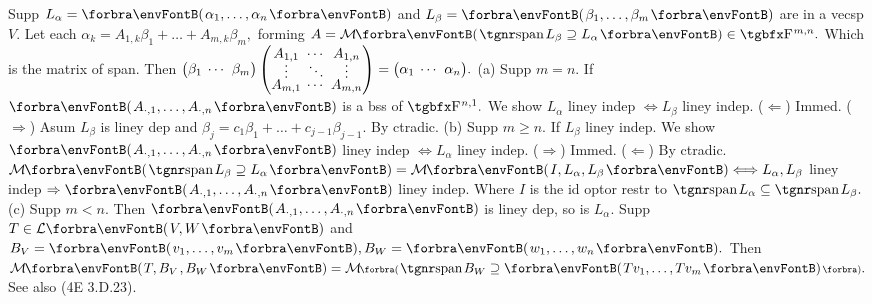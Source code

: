 
\vspace{8pt}

\BulletPointX\NoteFor{[3.30, 32]}\;\TextB{}
Supp $L_{\alpha}=\Par{\alpha_1,\dots,\alpha_n}$ and $L_{\beta}=\Par{\beta_1,\dots,\beta_m}$ are in a vecsp $V.$\TextB{}
Let each $\alpha_k=A_{1,k}\beta_1+\dots+A_{m,k}\beta_m,$ forming $A=\Mt{\spn L_\beta\supseteq L_{\alpha}}\in\FbbP{m,n}.$\TextB{\vspace{3pt}}
Which is {\tgsl the matrix of span}. \;Then ${\normalsize\begin{pmatrix}\beta_1 &\hspace{-6pt} \cdots &\hspace{-6pt} \beta_m\end{pmatrix}\begin{pmatrix}
	A_{1,1} &\hspace{-6pt} \cdots &\hspace{-6pt} A_{1,n}\\[-4pt]
	\vdots	&\hspace{-6pt} \ddots &\hspace{-6pt} \vdots \\[-4pt]
	A_{m,1} &\hspace{-6pt} \cdots &\hspace{-6pt} A_{m,n}
\end{pmatrix}}={\normalsize\begin{pmatrix}\alpha_1 &\hspace{-6pt} \cdots &\hspace{-6pt} \alpha_n\end{pmatrix}}.$\TextB{\vspace{6pt}}
(a) Supp $m=n.$ If $\Par{A_{\cdot,1},\dots,A_{\cdot,n}}$ is a bss of $\FbbP{n,1}.$ We show $L_{\alpha}$ liney indep $\Longleftrightarrow L_{\beta}$ liney indep.\TextB{}
\Ha ($\Leftarrow$) Immed. ($\Rightarrow$) Asum $L_{\beta}$ is liney dep and $\beta_j=c_1\beta_1+\dots+c_{j-1}\beta_{j-1}.$ By ctradic.\PfEnd\vspace{2pt}\TextB{}
(b) Supp $m\geqslant n.$ If $L_{\beta}$ liney indep. We show $\Par{A_{\cdot,1},\dots,A_{\cdot,n}}$ liney indep $\Longleftrightarrow L_{\alpha}$ liney indep.\TextB{}
\Hb ($\Rightarrow$) Immed. ($\Leftarrow$) By ctradic.\PfEnd\TextB{}
\Hb\ANote $\Mt{\spn L_{\beta}\supseteq L_\alpha}=\Mt{I,L_{\alpha},L_{\beta}}\Longleftrightarrow L_{\alpha},L_{\beta}$ liney indep $\Rightarrow\Par{A_{\cdot,1},\dots,A_{\cdot,n}}$ liney indep.\parNot{\Hb\IndentB}
Where $I$ is the id optor restr to $\spn L_{\alpha}\subseteq\spn L_{\beta}.$
\vspace{3pt}\TextB{}
(c) Supp $m<n.$ Then $\Par{A_{\cdot,1},\dots,A_{\cdot,n}}$ is liney dep, so is $L_{\alpha}.$\TextB{\vspace{5pt}}
Supp $T\in\Lm{V,W}$ and $B_V=\Par{v_1,\dots,v_m},B_W=\Par{w_1,\dots,w_n}.$\TextB{}
Then $\Mt{T,B_V\hspace{1pt},B_W}=\Mt[\BigPar]{\spn B_W\supseteq\Par{Tv_1,\dots,Tv_m}}.$ \;See also (4E 3.D.23).
\SepLine

